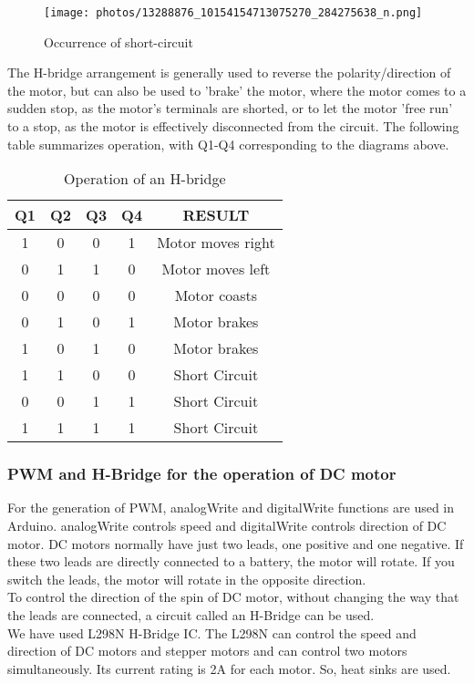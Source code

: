 \begin{figure}[h]
\center
\texttt{[image: photos/13288876\_10154154713075270\_284275638\_n.png]} 
\caption{Occurrence of short-circuit}
\end{figure}
\justify
The H-bridge arrangement is generally used to reverse the polarity/direction of the motor, but can also be used to 'brake' the motor, where the motor comes to a sudden stop, as the motor's terminals are shorted, or to let the motor 'free run' to a stop, as the motor is effectively disconnected from the circuit. The following table summarizes operation, with Q1-Q4 corresponding to the diagrams above.\\
\begin{table}[h]
\begin{center}
\begin{tabular}{ |c|c|c|c|c| } 
 \hline
 Q1 & 	Q2 & Q3&Q4&RESULT\\ 
 \hline
 1 & 0 & 0 &1& Motor moves right \\ 
 \hline
 0 &  1&  1&0& Motor moves left \\ 
\hline
 0 & 0 & 0 & 0 & Motor coasts \\
\hline
 0&1&0&1&Motor brakes  \\
\hline
1&0&1&0&Motor brakes \\
\hline
1&1&0&0& Short Circuit\\
\hline
0&0&1&1& Short Circuit \\
\hline
1 &1&1&1& Short Circuit\\
 \hline
\end{tabular}
\caption{Operation of an H-bridge}
\end{center}
\end{table}
\newpage
\subsubsection*{PWM and H-Bridge for the operation of DC motor}
For the generation of PWM, analogWrite and digitalWrite functions are used in Arduino.
analogWrite controls speed and digitalWrite controls direction of DC motor.
DC motors normally have just two leads, one positive and one negative. If these two leads are directly connected to a battery, the motor will rotate. If you switch the leads, the motor will rotate in the opposite direction.\\
To control the direction of the spin of DC motor, without changing the way that the leads are connected, a circuit called an H-Bridge can be used. \\
We have used L298N H-Bridge IC. The L298N can control the speed and direction of DC motors and stepper motors and can control two motors simultaneously. Its current rating is 2A for each motor. So, heat sinks are used.\\
\newpage
